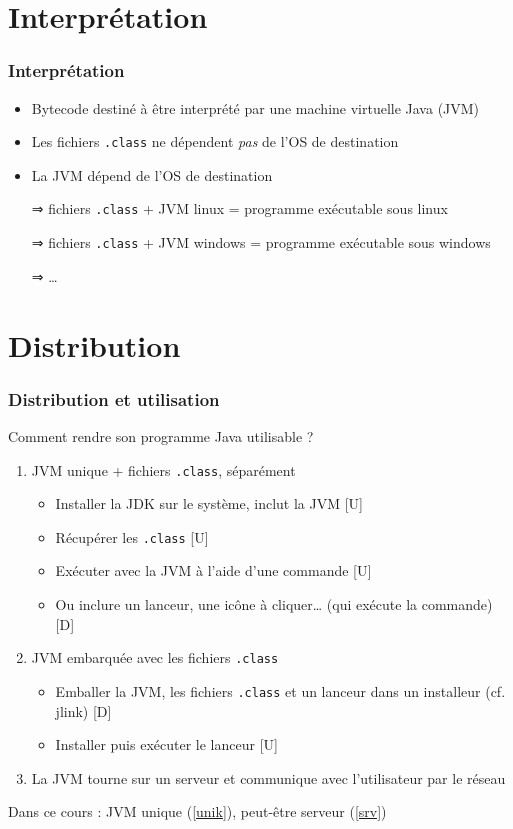 \documentclass[english, french]{beamer}
\begin{document}
\section{Interprétation}
\begin{frame}
	\frametitle{Interprétation}
	\begin{itemize}
		\item Bytecode destiné à être interprété par une machine virtuelle Java (JVM)
		\item Les fichiers \texttt{.class} ne dépendent \emph{pas} de l’OS de destination
		\item La JVM dépend de l’OS de destination
		\item[⇒] fichiers \texttt{.class} + JVM linux = programme exécutable sous linux
		\item[⇒] fichiers \texttt{.class} + JVM windows = programme exécutable sous windows
		\item[⇒] …
	\end{itemize}
\end{frame}

\section{Distribution}
\begin{frame}
	\frametitle{Distribution et utilisation}
	Comment rendre son programme Java utilisable ?
	\begin{enumerate}
		\item \label{unik} JVM unique + fichiers \texttt{.class}, séparément
		\begin{itemize}
			\item Installer la JDK sur le système, inclut la JVM [U]
			\item Récupérer les \texttt{.class} [U]
			\item Exécuter avec la JVM à l’aide d’une commande [U]
			\item Ou inclure un lanceur, une icône à cliquer… (qui exécute la commande) [D]
		\end{itemize}
		\item JVM embarquée avec les fichiers \texttt{.class}
		\begin{itemize}
			\item Emballer la JVM, les fichiers \texttt{.class} et un lanceur dans un installeur (cf. jlink) [D]
			\item Installer puis exécuter le lanceur [U]
		\end{itemize}
		\item \label{srv} La JVM tourne sur un serveur et communique avec l’utilisateur par le réseau
	\end{enumerate}
	Dans ce cours : JVM unique (\ref{unik}), peut-être serveur (\ref{srv})
\end{frame}
\end{document}
